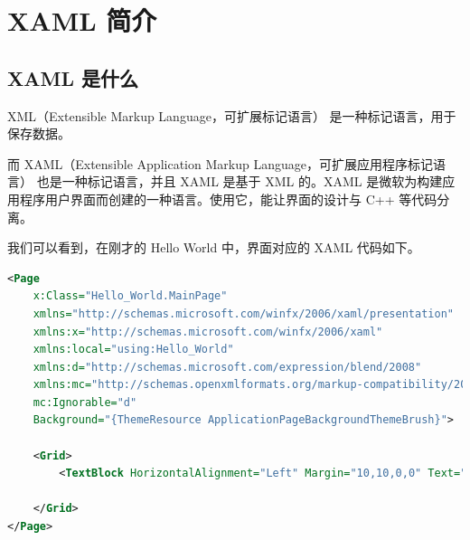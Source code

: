 




\section{XAML 简介}

\subsection{XAML 是什么}

XML（Extensible Markup Language，可扩展标记语言）
是一种标记语言，用于保存数据。

而 XAML（Extensible Application Markup Language，可扩展应用程序标记语言）
也是一种标记语言，并且 XAML 是基于 XML 的。XAML 是微软为构建应用程序用户界面而创建的一种语言。使用它，能让界面的设计与 C++ 等代码分离。\cite{XAMLbaidu}

我们可以看到，在刚才的 Hello World 中，界面对应的 XAML 代码如下。

\begin{lstlisting}[language = xml]
<Page
    x:Class="Hello_World.MainPage"
    xmlns="http://schemas.microsoft.com/winfx/2006/xaml/presentation"
    xmlns:x="http://schemas.microsoft.com/winfx/2006/xaml"
    xmlns:local="using:Hello_World"
    xmlns:d="http://schemas.microsoft.com/expression/blend/2008"
    xmlns:mc="http://schemas.openxmlformats.org/markup-compatibility/2006"
    mc:Ignorable="d"
    Background="{ThemeResource ApplicationPageBackgroundThemeBrush}">

    <Grid>
        <TextBlock HorizontalAlignment="Left" Margin="10,10,0,0" Text="Hello World" TextWrapping="Wrap" VerticalAlignment="Top" FontSize="72"/>

    </Grid>
</Page>
\end{lstlisting}

